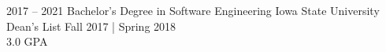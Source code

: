 \documentclass[9pt]{developercv} %
\begin{document}
\vspace{0.5cm}

\begin{minipage}[t]{0.5\textwidth} %
	\vspace{-\baselineskip} %
	\begin{barchart}{5.5}


	\end{barchart}
\end{minipage}
\begin{minipage}[t]{0.5\textwidth} %
	\vspace{-\baselineskip} %
	\begin{barchart}{5.5}


	\end{barchart}
\end{minipage}



\begin{entrylist}
	\entry
		{2017 -- 2021}
		{Bachelor's Degree in Software Engineering}
		{Iowa State University}
		{Dean's List Fall 2017 | Spring 2018 \\ 3.0 GPA}
\end{entrylist}


\end{document}
